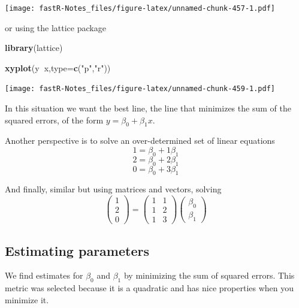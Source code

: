 \documentclass[]{book}
\newenvironment{Shaded}{\begin{snugshade}}{\end{snugshade}}
\newcommand{\KeywordTok}[1]{\textcolor[rgb]{0.13,0.29,0.53}{\textbf{#1}}}
\newcommand{\DataTypeTok}[1]{\textcolor[rgb]{0.13,0.29,0.53}{#1}}
\newcommand{\StringTok}[1]{\textcolor[rgb]{0.31,0.60,0.02}{#1}}
\newcommand{\OperatorTok}[1]{\textcolor[rgb]{0.81,0.36,0.00}{\textbf{#1}}}
\newcommand{\NormalTok}[1]{#1}
\theoremstyle{definition}
\theoremstyle{definition}
\theoremstyle{definition}
\theoremstyle{remark}
\begin{document}
\texttt{[image: fastR-Notes\_files/figure-latex/unnamed-chunk-457-1.pdf]}

or using the lattice package

\begin{Shaded}
\begin{Highlighting}[]
\KeywordTok{library}\NormalTok{(lattice)}
\end{Highlighting}
\end{Shaded}

\begin{Shaded}
\begin{Highlighting}[]
\KeywordTok{xyplot}\NormalTok{(y}\OperatorTok{~}\NormalTok{x,}\DataTypeTok{type=}\KeywordTok{c}\NormalTok{(}\StringTok{"p"}\NormalTok{,}\StringTok{"r"}\NormalTok{))}
\end{Highlighting}
\end{Shaded}

\texttt{[image: fastR-Notes\_files/figure-latex/unnamed-chunk-459-1.pdf]}

In this situation we want the best line, the line that minimizes the sum
of the squared errors, of the form \(y=\beta_{0}+\beta_{1}x\).

Another perspective is to solve an over-determined set of linear
equations \[1=\beta_{0}+1\beta_{1}\] \[2=\beta_{0}+2\beta_{1}\]
\[0=\beta_{0}+3\beta_{1}\]

And finally, similar but using matrices and vectors, solving
\[\left( \begin{array}{c} 1 \\ 2 \\ 0 \end{array} \right) = \left( \begin{array}{cc} 1 & 1 \\ 1 & 2 \\ 1 & 3 \end{array} \right)\left( \begin{array}{c} \beta_{0} \\ \beta_{1} \end{array} \right)\]

\subsection{Estimating parameters}\label{estimating-parameters}

We find estimates for \(\beta_{0}\) and \(\beta_{1}\) by minimizing the
sum of squared errors. This metric was selected because it is a
quadratic and has nice properties when you minimize it.
\end{document}
